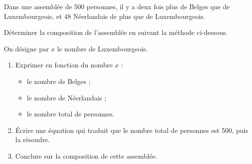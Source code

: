 \begin{exercice*}
    Dans une assemblée de 500 personnes, il y a deux fois plus de Belges que de Luxembourgeois, 
    et 48 Néerlandais de plus que de Luxembourgeois. 
    
    Déterminer la composition de l'assemblée en suivant la méthode ci-dessous. 
    
    On désigne par $x$ le nombre de Luxembourgeois.
    \begin{enumerate}
        \item Exprimer en fonction du nombre $x$ :
        \begin{itemize}
            \item le nombre de Belges ;
            \item le nombre de Néerlandais ;
            \item le nombre total de personnes.
        \end{itemize}
        \item Écrire une équation qui traduit que le nombre total de personnes est 500, puis la résoudre.
        \item Conclure sur la composition de cette assemblée.
    \end{enumerate}
\end{exercice*}
